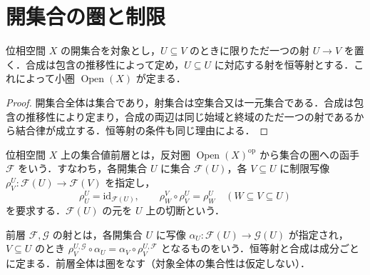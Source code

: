 \section{開集合の圏と制限}
\begin{prop}[開集合の圏]
位相空間 $X$ の開集合を対象とし，$U\subseteq V$ のときに限りただ一つの射 $U\to V$ を置く．合成は包含の推移性によって定め，$U\subseteq U$ に対応する射を恒等射とする．これによって小圏 $\operatorname{Open}(X)$ が定まる．
\end{prop}
\begin{proof}
開集合全体は集合であり，射集合は空集合又は一元集合である．合成は包含の推移性により定まり，合成の両辺は同じ始域と終域のただ一つの射であるから結合律が成立する．恒等射の条件も同じ理由による．
\end{proof}
\begin{defn}[集合値前層]
位相空間 $X$ 上の集合値前層とは，反対圏 $\operatorname{Open}(X)^{\mathrm{op}}$ から集合の圏への函手 $\mathcal F$ をいう．すなわち，各開集合 $U$ に集合 $\mathcal F(U)$，各 $V\subseteq U$ に制限写像 $\rho^U_V:\mathcal F(U)\to\mathcal F(V)$ を指定し，
\[
 \rho^U_U=\mathrm{id}_{\mathcal F(U)},\qquad
 \rho^V_W\circ\rho^U_V=\rho^U_W\quad(W\subseteq V\subseteq U)
\]
を要求する．$\mathcal F(U)$ の元を $U$ 上の切断という．
\end{defn}
\begin{defn}[前層の射]
前層 $\mathcal F,\mathcal G$ の射とは，各開集合 $U$ に写像 $\alpha_U:\mathcal F(U)\to\mathcal G(U)$ が指定され，$V\subseteq U$ のとき $\rho^{U,\mathcal G}_V\circ\alpha_U=\alpha_V\circ\rho^{U,\mathcal F}_V$ となるものをいう．恒等射と合成は成分ごとに定まる．前層全体は圏をなす（対象全体の集合性は仮定しない）．
\end{defn}
